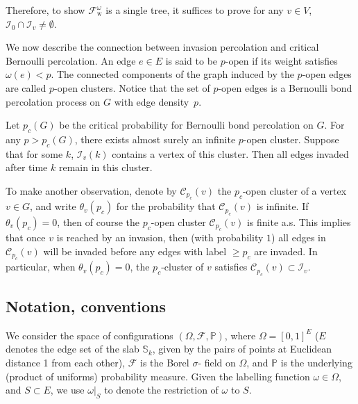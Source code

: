 \documentclass[12pt, twoside,a4paper,reqno]{amsart}
\theoremstyle{plain}
\theoremstyle{remark}
\theoremstyle{definition}
\begin{document}
Therefore, to show $\mathcal{F}_{\mathrm w}^{\omega }$ is a single tree, it suffices
to prove for any $v\in V$, $\mathcal{I}_{0}\cap \mathcal{I}_{v}\neq
\emptyset $.

We now describe the connection between invasion percolation and critical Bernoulli
percolation. An edge $e\in E$ is said to be $p$-open if its weight satisfies
$\omega(e)<p$. The connected components of the graph induced by the $p$-open
edges are called $p$-open clusters. Notice that the set of $p$-open edges is a
Bernoulli bond percolation process on $G$ with edge density~$p$.

Let $p_{c}( G) $ be the critical
probability for Bernoulli bond percolation on $G$. For any $p>p_{c}( G) $,
 there exists almost surely an infinite $p$-open cluster. Suppose that
for some $k$, $\mathcal{I}_{v}( k) $ contains a vertex of this
cluster. Then all edges invaded after time $k$ remain in this cluster.

To make another observation, denote by $\mathcal{C}%
_{p_{c}}( v) $ the $p_{c}$-open cluster of a vertex $v\in G$, and
write $\theta_v ( p_c)$ for the probability that $\mathcal
C_{p_c}(v)$ is infinite. If $\theta_v ( p_c) =0$, then of course
the $p_c$-open cluster $\mathcal{C}_{p_{c}}( v) $ is finite a.s. This
implies that once $v$ is reached by an invasion, then (with probability $1$) all edges in $\mathcal{C}_{p_{c}}(
  v) $ will be invaded before any edges with label $\geq p_{c}$ are invaded.
In particular, when $\theta_v(p_c)=0$, the $p_c$-cluster of $v$
satisfies $\mathcal{C}_{p_{c}}( v)\subset \mathcal{I}_{v} $.

\subsection{Notation, conventions\label{sec:notation-conventions}}

\bigskip We consider the space of configurations $( \Omega
  ,\mathcal{F},\mathbb{P}) $, where $\Omega =[ 0,1] ^{E}$ ($E$
denotes the edge set of the slab $\mathbb{S}_{k}$, given by the pairs of points
at Euclidean distance 1 from each other), $\mathcal{F}$ is the Borel $\sigma $-%
field on $\Omega $, and $\mathbb{P}$ is the underlying (product of uniforms)
probability measure. Given the labelling function $\omega \in \Omega $, and
$S\subset E$, we use $%
\omega |_{S}$ to denote the restriction of $\omega $ to $S$.
\end{document}
